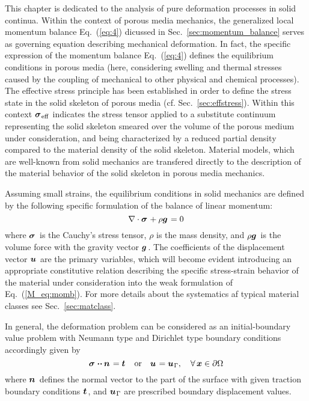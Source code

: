 This chapter is dedicated to the analysis of pure deformation processes in solid continua. Within the context of porous media mechanics, the generalized local momentum balance Eq.~(\ref{eq:4}) dicussed in Sec.~\ref{sec:momentum_balance} serves as governing equation describing mechanical deformation. In fact, the specific expression of the momentum balance Eq.~(\ref{eq:4}) defines the equilibrium conditions in porous media (here, considering swelling and thermal stresses caused by the coupling of mechanical to other physical and chemical processes). The effective stress principle has been established in order to define the stress state in the solid skeleton of porous media (cf. Sec.~\ref{sec:effstress}). Within this context $\mbox{${\mbox{\boldmath${\sigma}$\unboldmath}}_{\:\!\mathrm{eff}}$}$ indicates the stress tensor applied to a substitute continuum representing the solid skeleton smeared over the volume of the porous medium under consideration, and being characterized by a reduced partial density compared to the material density of the solid skeleton. Material models, which are well-known from solid mechanics are transfered directly to the description of the material behavior of the solid skeleton in porous media mechanics.

Assuming small strains, the equilibrium conditions in solid mechanics are defined by the following specific formulation of the balance of linear momentum:
\begin{equation}
\nabla \cdot \miu{\sigma}{}{} + \rho\miu{g}{}{} = 0
\label{M_eq:momb}
\end{equation}
where $\mbox{${\mbox{\boldmath${\sigma}$\unboldmath}}_{\:\!}$}$ is the Cauchy's stress tensor, $\rho$ is the mass density, and $\rho\mbox{${\mbox{\boldmath${g}$\unboldmath}}_{\:\!}$}$ is the volume force with the gravity vector $\mbox{${\mbox{\boldmath${g}$\unboldmath}}^{\:\!}$}$. The coefficients of the displacement vector $\mbox{${\mbox{\boldmath${u}$\unboldmath}}_{\:\!}$}$ are the primary variables, which will become evident introducing an appropriate constitutive relation describing the specific stress-strain behavior of the material under consideration into the weak formulation of Eq.~(\ref{M_eq:momb}). For more details about the systematics af typical material classes see Sec.~\ref{sec:matclass}.

In general, the deformation problem can be considered as an initial-boundary value problem with Neumann type and Dirichlet type boundary conditions accordingly given by
\begin{equation}
\miu{\sigma}{}{}\ccdot\miu{n}{}{}= \miu{t}{}{}
\quad \mbox{or} \quad
\miu{u}{}{} = \miu{u}{\Gamma}{},
\quad \forall\,\Point \in
\partial \Omega
\label{M_eq:debc}
\end{equation}
where $\mbox{${\mbox{\boldmath${n}$\unboldmath}}_{\:\!}$}$ defines the normal vector to the part of the surface with given traction boundary conditions $\mbox{${\mbox{\boldmath${t}$\unboldmath}}_{\:\!}$}$, and $\mbox{${\mbox{\boldmath${u}$\unboldmath}}_{\:\!\Gamma}$}$ are prescribed boundary displacement values.


